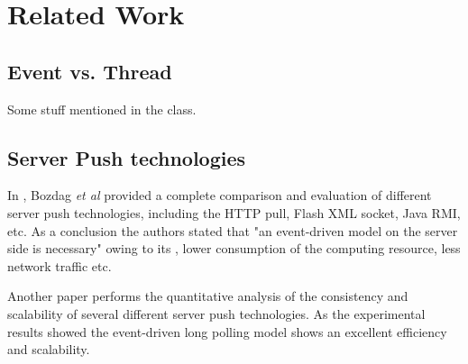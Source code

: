 \section{Related Work\\}

\subsection{Event vs. Thread\\}

Some stuff mentioned in the class.

\subsection{Server Push technologies\\}

In \cite{Engin}, Bozdag \emph{et al} provided a complete comparison 
and evaluation of different server push technologies, including the 
HTTP pull, Flash XML socket, Java RMI, etc. As a conclusion the authors 
stated that "an event-driven model on the server side is necessary" 
owing to its , lower consumption of the computing resource, less network
traffic etc.

Another paper \cite{duquennoy09consistency} performs the quantitative 
analysis of the consistency and scalability of several different server
push technologies. As the experimental results showed the event-driven
long polling model shows an excellent efficiency and scalability.

